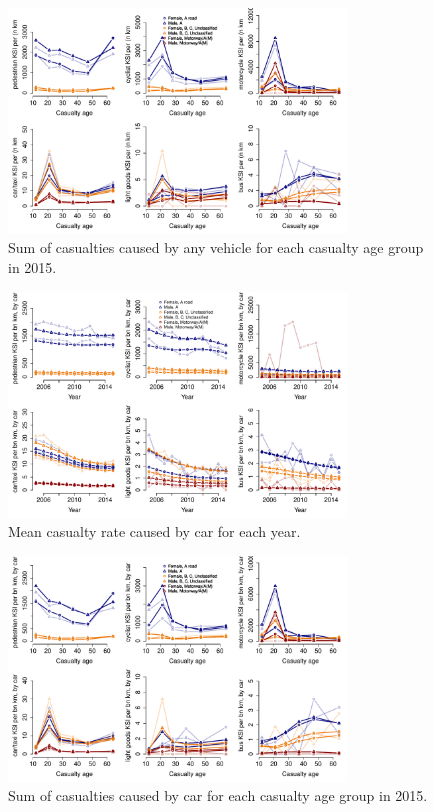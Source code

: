\documentclass{article}
\begin{document}
\begin{figure}[H]
\centering
\includegraphics[width=0.8\textwidth]{pred6Age2015.pdf}
\caption{\small Sum of casualties caused by any vehicle for each casualty age group in 2015.}
\label{pred6Age2015}
\end{figure}

\begin{figure}[H]
\centering
\includegraphics[width=0.8\textwidth]{pred6yearCar.pdf}
\caption{\small Mean casualty rate caused by car for each year.}
\label{pred6yearCar}
\end{figure}

\begin{figure}[H]
\centering
\includegraphics[width=0.8\textwidth]{pred6Age2015Car.pdf}
\caption{\small Sum of casualties caused by car for each casualty age group in 2015.}
\label{pred6Age2015Car}
\end{figure}
\end{document}
